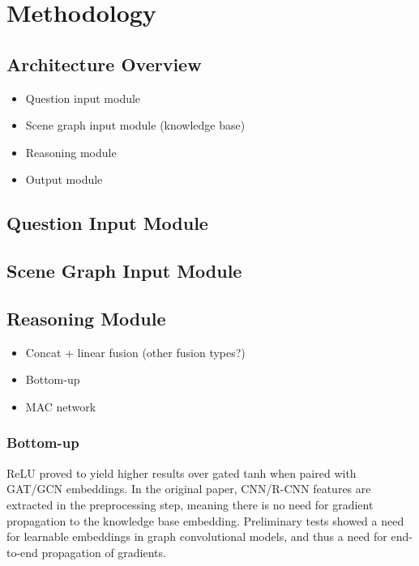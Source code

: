 \chapter{Methodology}
\label{chapter:methodology}

\section{Architecture Overview}
\label{section:architecture_overview}

\begin{itemize}
  \item Question input module
  \item Scene graph input module (knowledge base)
  \item Reasoning module
  \item Output module
\end{itemize}

\section{Question Input Module}
\label{section:question_input_module}

\section{Scene Graph Input Module}
\label{section:scene_graph_input_module}

\section{Reasoning Module}
\label{section:reasoning_module}

\begin{itemize}
  \item Concat + linear fusion (other fusion types?)
  \item Bottom-up
  \item MAC network
\end{itemize}

\subsection{Bottom-up}
\label{subsection:mac_network}

{\color{red} ReLU proved to yield higher results over gated tanh when paired with GAT/GCN embeddings. In the original paper, CNN/R-CNN features are extracted in the preprocessing step, meaning there is no need for gradient propagation to the knowledge base embedding. Preliminary tests showed a need for learnable embeddings in graph convolutional models, and thus a need for end-to-end propagation of gradients.}

